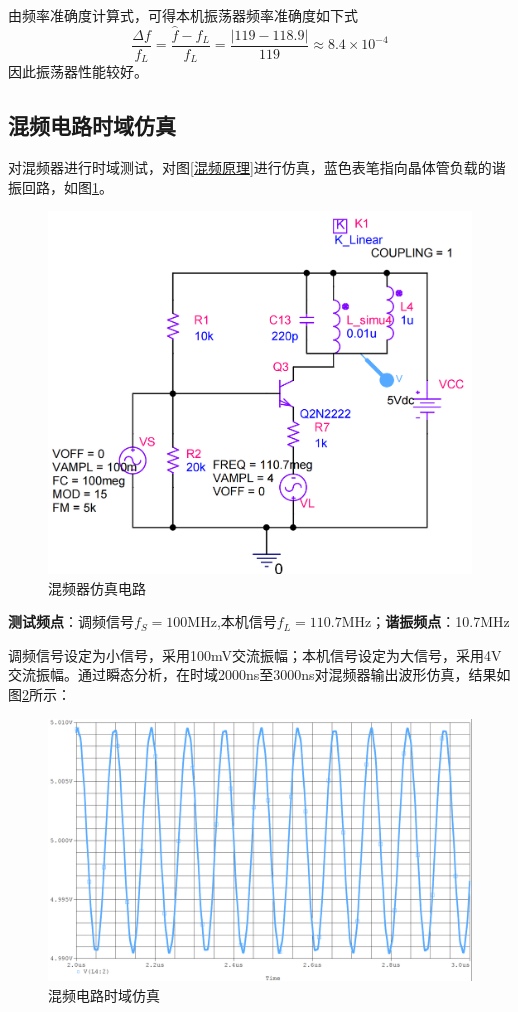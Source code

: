 \documentclass[a4paper,12pt,twoside]{article}
\begin{document}
由频率准确度计算式，可得本机振荡器频率准确度如下式
\begin{equation}
    \frac{\Delta f}{f_L}=\frac{\hat{f}-f_L}{f_L}=\frac{|119-118.9|}{119}\approx 8.4\times 10^{-4}
\end{equation}
因此振荡器性能较好。



\subsection{混频电路时域仿真}
对混频器进行时域测试，对图\ref{混频原理}进行仿真，蓝色表笔指向晶体管负载的谐振回路，如图\ref{混频仿真电路}。
\begin{figure}[H]
    \centering
    \includegraphics[scale=0.18]{混频仿真电路.png}
    \caption{混频器仿真电路}
    \label{混频仿真电路}
\end{figure}

\textbf{测试频点}：调频信号$f_S=100$MHz,本机信号$f_L=110.7$MHz；\textbf{谐振频点}：10.7MHz

调频信号设定为小信号，采用100mV交流振幅；本机信号设定为大信号，采用4V交流振幅。通过瞬态分析，在时域2000ns至3000ns对混频器输出波形仿真，结果如图\ref{混频wave}所示：
\begin{figure}[H]
    \centering
    \includegraphics[scale=0.19]{混频时域.png}
    \caption{混频电路时域仿真}
    \label{混频wave}
\end{figure}
\end{document}
